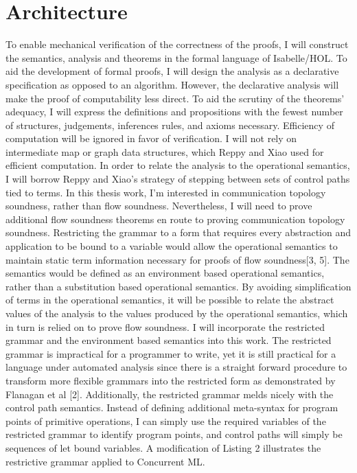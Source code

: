 \documentclass{article}
\begin{document}
\section{Architecture}
To enable mechanical verification of the correctness of the proofs, I will construct the semantics, analysis and theorems in the formal language of Isabelle/HOL.  To aid the development of formal proofs, I will design the analysis as a declarative specification as opposed to an algorithm.  However, the declarative analysis will make the proof of computability less direct.  To aid the scrutiny of the theorems' adequacy, I will express the definitions and propositions with the fewest number of structures, judgements, inferences rules, and axioms necessary.  Efficiency of computation will be ignored in favor of verification.  I will not rely on intermediate map or graph data structures, which Reppy and Xiao used for efficient computation.  In order to relate the analysis to the operational semantics, I will borrow Reppy and Xiao's strategy of stepping between sets of control paths tied to terms.
	In this thesis work, I'm interested in communication topology soundness, rather than flow soundness.  Nevertheless, I will need to prove additional flow soundness theorems en route to proving communication topology soundness.  Restricting the grammar to a form that requires every abstraction and application to be bound to a variable would allow the operational semantics to maintain static term information necessary for proofs of flow soundness[3, 5].  The semantics would be defined as an environment based operational semantics, rather than a substitution based operational semantics.  By avoiding simplification of terms in the operational semantics, it will be possible to relate the abstract values of the analysis to the values produced by the operational semantics, which in turn is relied on to prove flow soundness.
	I will incorporate the restricted grammar and the environment based semantics into this work. The restricted grammar is impractical for a programmer to write, yet it is still practical for a language under automated analysis since there is a straight forward procedure to transform more flexible grammars into the restricted form as demonstrated by Flanagan et al [2].  Additionally, the restricted grammar melds nicely with the control path semantics.  Instead of defining additional meta-syntax for program points of primitive operations, I can simply use the required variables of the restricted grammar to identify program points, and control paths will simply be sequences of let bound variables. A modification of Listing 2 illustrates the restrictive grammar applied to Concurrent ML.
\end{document}
